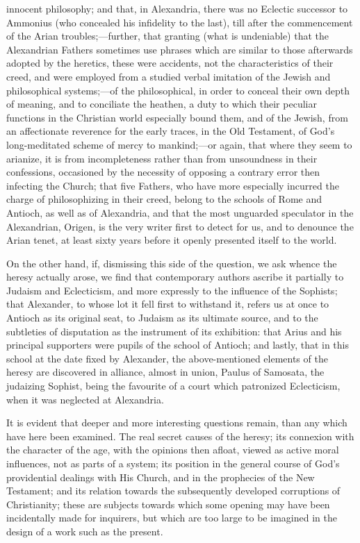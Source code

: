 innocent philosophy; and that, in Alexandria, there was no Eclectic
successor to Ammonius (who concealed his infidelity to the last), till
after the commencement of the Arian troubles;—further, that granting
(what is undeniable) that the Alexandrian Fathers sometimes use
phrases which are similar to those afterwards adopted by the heretics,
these were accidents, not the characteristics of their creed, and were
employed from a studied verbal imitation of the Jewish and
philosophical systems;—of the philosophical, in order to conceal
their own depth of meaning, and to conciliate the heathen, a duty to
which their peculiar functions in the Christian world especially bound
them, and of the Jewish, from an affectionate reverence for the early
traces, in the Old Testament, of God's long-meditated scheme of mercy
to mankind;—or again, that where they seem to arianize, it is from
incompleteness rather than from unsoundness in their confessions,
occasioned by the necessity of opposing a contrary error then
infecting the Church; that five Fathers, who have more especially
incurred the charge of philosophizing in their creed, belong to the
schools of Rome and Antioch, as well as of Alexandria, and that the
most unguarded speculator in the Alexandrian, Origen, is the very
writer first to detect for us, and to denounce the Arian tenet, at
least sixty years before it openly presented itself to the world.

On the other hand, if, dismissing this side of the question,
we ask whence the heresy actually arose, we find that contemporary
authors ascribe it partially to Judaism and Eclecticism, and more
expressly to the influence of the Sophists; that Alexander, to whose
lot it fell first to withstand it, refers us at once to Antioch as its
original seat, to Judaism as its ultimate source, and to the
subtleties of disputation as the instrument of its exhibition: that
Arius and his principal supporters were pupils of the school of
Antioch; and lastly, that in this school at the date fixed by
Alexander, the above-mentioned elements of the heresy are discovered
in alliance, almost in union, Paulus of Samosata, the judaizing
Sophist, being the favourite of a court which patronized Eclecticism,
when it was neglected at Alexandria.

It is evident that deeper and more interesting questions remain,
than any which have here been examined. The real secret causes of the
heresy; its connexion with the character of the age, with the opinions
then afloat, viewed as active moral influences, not as parts of a
system; its position in the general course of God's providential
dealings with His Church, and in the prophecies of the New Testament;
and its relation towards the subsequently developed corruptions of
Christianity; these are subjects towards which some opening may have
been incidentally made for inquirers, but which are too large to be
imagined in the design of a work such as the present.

